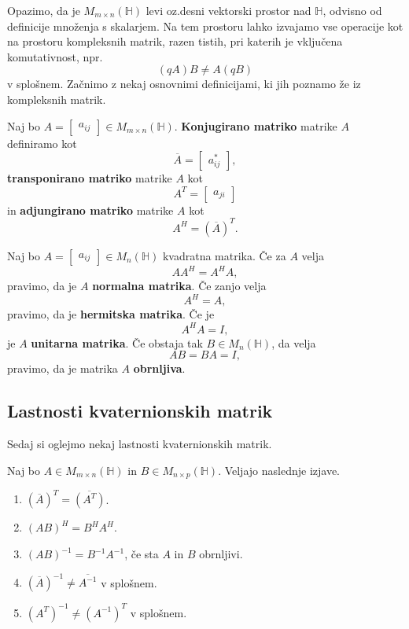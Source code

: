 \documentclass[mat1, tisk]{fmfdelo}
\numberwithin{equation}{section}
\begin{document}
\noindent
Opazimo, da je $M_{m \times n}(\mathbb{H})$ levi oz.\@ desni vektorski prostor nad $\mathbb{H}$, odvisno od definicije množenja s 
skalarjem. Na tem prostoru lahko izvajamo vse operacije kot na prostoru kompleksnih matrik, razen tistih, pri katerih je vključena komutativnost, npr.
$$(qA)B \neq A(qB)$$
v splošnem. Začnimo z nekaj osnovnimi definicijami, ki jih poznamo že iz kompleksnih matrik.

\begin{definicija}
    Naj bo $A =
        \begin{bmatrix}
            a_{ij}
        \end{bmatrix}
        \in M_{m \times n}(\mathbb{H})$. \textbf{Konjugirano matriko} matrike $A$ definiramo kot 
        \[ \overline{A} = 
        \begin{bmatrix}
            a_{ij}^{*}
        \end{bmatrix}, \]
        \textbf{transponirano matriko} matrike $A$ kot
        \[ A^{T} =
        \begin{bmatrix}
            a_{ji}
        \end{bmatrix} \]
        in \textbf{adjungirano matriko} matrike $A$  kot
        \[ A^{H} = (\overline{A})^{T}. \]
\end{definicija}
\begin{definicija}
    Naj bo $A =
        \begin{bmatrix}
            a_{ij}
        \end{bmatrix}
        \in M_{n}(\mathbb{H})$ kvadratna matrika. Če za $A$ velja
        $$AA^{H} = A^{H}A,$$
        pravimo, da je $A$ \textbf{normalna matrika}. Če zanjo velja
        $$A^{H} = A,$$
        pravimo, da je \textbf{hermitska matrika}. Če je
        $$A^{H}A = I,$$
        je $A$ \textbf{unitarna matrika}. Če obstaja tak $B \in M_{n}(\mathbb{H})$, da velja
        $$AB = BA = I,$$
        pravimo, da je matrika $A$ \textbf{obrnljiva}.
\end{definicija}

\subsection{Lastnosti kvaternionskih matrik}
Sedaj si oglejmo nekaj lastnosti kvaternionskih matrik.

\begin{trditev}\label{lastnosti_matrike}
    Naj bo $A\in M_{m \times n}(\mathbb{H})$  in $B\in M_{n \times p}(\mathbb{H})$. Veljajo naslednje izjave.
    \begin{enumerate}
        \item $(\overline{A})^{T} = \overline{(A^{T})}$.
        \item $(AB)^{H} = B^{H}A^{H}$.
        \item $(AB)^{-1} = B^{-1}A^{-1}$, če sta $A$ in $B$ obrnljivi.
        \item $(\overline{A})^{-1} \neq \overline{A^{-1}}$ v splošnem.
        \item ${(A^{T})}^{-1} \neq {(A^{-1})}^{T}$ v splošnem.
    \end{enumerate}
\end{trditev}
\end{document}
